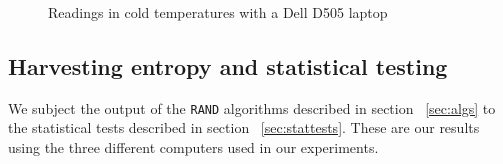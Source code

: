 \documentclass[a4paper]{article}           %
\begin{document}
  \begin{figure}[h!]
    \centering  

    \caption{Readings in cold temperatures with a Dell D505 laptop}
    \label{fig:ardcold}
        
  \end{figure}
 


\FloatBarrier
\subsection{Harvesting entropy and statistical testing}
\label{sec:harvest}

We subject the output of the \texttt{RAND} algorithms described in section ~\ref{sec:algs} to the statistical tests described in section ~\ref{sec:stattests}. These are our results using the three different computers used in our experiments. 
\end{document}
